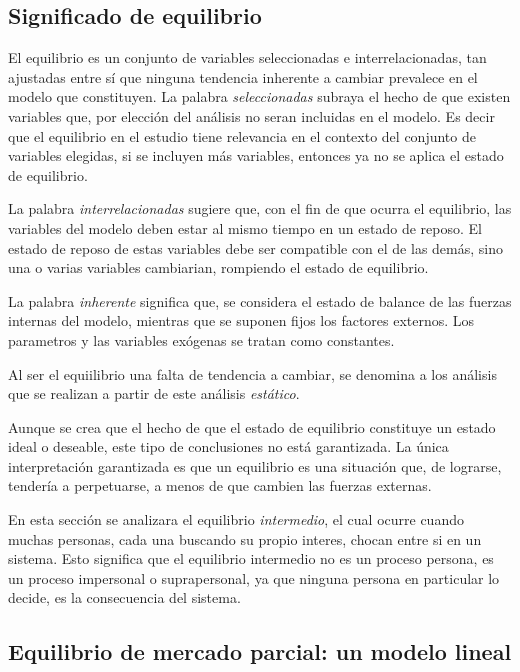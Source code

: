 \subsection{Significado de equilibrio}

El equilibrio es un conjunto de variables seleccionadas e interrelacionadas, tan ajustadas entre sí que ninguna tendencia inherente a cambiar prevalece en el modelo que constituyen. La palabra \textit{seleccionadas} subraya el hecho de que existen variables que, por elección del análisis no seran incluidas en el modelo. Es decir que el equilibrio en el estudio tiene relevancia en el contexto del conjunto de variables elegidas, si se incluyen más variables, entonces ya no se aplica el estado de equilibrio.

La palabra \textit{interrelacionadas} sugiere que, con el fin de que ocurra el equilibrio, las variables del modelo deben estar al mismo tiempo en un estado de reposo. El estado de reposo de estas variables debe ser compatible con el de las demás, sino una o varias variables cambiarian, rompiendo el estado de equilibrio.

La palabra \textit{inherente} significa que, se considera el estado de balance de las fuerzas internas del modelo, mientras que se suponen fijos los factores externos. Los parametros y las variables exógenas se tratan como constantes. 

Al ser el equiilibrio una falta de tendencia a cambiar, se denomina a los análisis que se realizan a partir de este análisis \textit{estático}.

Aunque se crea que el hecho de que el estado de equilibrio constituye un estado ideal o deseable, este tipo de conclusiones no está garantizada. La única interpretación garantizada es que un equilibrio es una situación que, de lograrse, tendería a perpetuarse, a menos de que cambien las fuerzas externas.

En esta sección se analizara el equilibrio \textit{intermedio}, el cual ocurre cuando muchas personas, cada una buscando su propio interes, chocan entre si en un sistema. Esto significa que el equilibrio intermedio no es un proceso persona, es un proceso impersonal o suprapersonal, ya que ninguna persona en particular lo decide, es la consecuencia del sistema.

\subsection{Equilibrio de mercado parcial: un modelo lineal}

